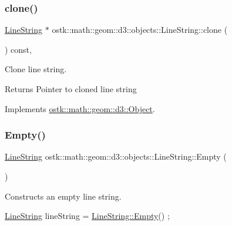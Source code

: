 \subsubsection{\texorpdfstring{clone()}{clone()}}
{\footnotesize\ttfamily \hyperlink{classostk_1_1math_1_1geom_1_1d3_1_1objects_1_1_line_string}{Line\+String} $\ast$ ostk\+::math\+::geom\+::d3\+::objects\+::\+Line\+String\+::clone (\begin{DoxyParamCaption}{ }\end{DoxyParamCaption}) const\hspace{0.3cm}{\ttfamily [override]}, {\ttfamily [virtual]}}



Clone line string. 

\begin{DoxyReturn}{Returns}
Pointer to cloned line string 
\end{DoxyReturn}


Implements \hyperlink{classostk_1_1math_1_1geom_1_1d3_1_1_object_a676013f9555f6492687f9809b2db887b}{ostk\+::math\+::geom\+::d3\+::\+Object}.

\mbox{\label{classostk_1_1math_1_1geom_1_1d3_1_1objects_1_1_line_string_a6b5c3b32f1f029f0948bc4f9f1dacf3b}} 
\subsubsection{\texorpdfstring{Empty()}{Empty()}}
{\footnotesize\ttfamily \hyperlink{classostk_1_1math_1_1geom_1_1d3_1_1objects_1_1_line_string}{Line\+String} ostk\+::math\+::geom\+::d3\+::objects\+::\+Line\+String\+::\+Empty (\begin{DoxyParamCaption}{ }\end{DoxyParamCaption})\hspace{0.3cm}{\ttfamily [static]}}



Constructs an empty line string. 


\begin{DoxyCode}
\hyperlink{classostk_1_1math_1_1geom_1_1d3_1_1objects_1_1_line_string_a711ebaa7353366ba729bf1ed648fd5a4}{LineString} lineString = \hyperlink{classostk_1_1math_1_1geom_1_1d3_1_1objects_1_1_line_string_a6b5c3b32f1f029f0948bc4f9f1dacf3b}{LineString::Empty}() ;
\end{DoxyCode}


